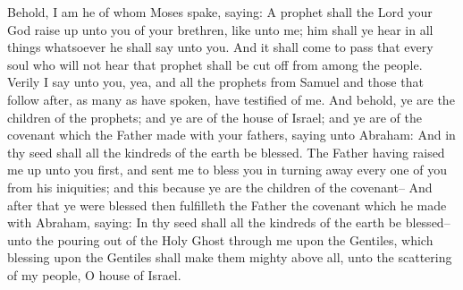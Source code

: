 \bverse \iffalse Behold, I am he of whom Moses spake, saying: A prophet shall the Lord your God raise up unto you of your brethren, like unto me; him shall ye hear in all things whatsoever he shall say unto you. And it shall come to pass that every soul who will not hear that prophet shall be cut off from among the people. \fi
Behold, I am he of whom Moses spake, saying: A prophet shall the Lord your God raise up unto you of your brethren, like unto me; him shall ye hear in all things whatsoever he shall say unto you. And it shall come to pass that every soul who will not hear that prophet shall be cut off from among the people.
\bverse \iffalse Verily I say unto you, yea, and all the prophets from Samuel and those that follow after, as many as have spoken, have testified of me. \fi
Verily I say unto you, yea, and all the prophets from Samuel and those that follow after, as many as have spoken, have testified of me.
\bverse \iffalse And behold, ye are the children of the prophets; and ye are of the house of Israel; and ye are of the covenant which the Father made with your fathers, saying unto Abraham: And in thy seed shall all the kindreds of the earth be blessed. \fi
And behold, ye are the children of the prophets; and ye are of the house of Israel; and ye are of the covenant which the Father made with your fathers, saying unto Abraham: And in thy seed shall all the kindreds of the earth be blessed.
\bverse \iffalse The Father having raised me up unto you first, and sent me to bless you in turning away every one of you from his iniquities; and this because ye are the children of the covenant-- \fi
The Father having raised me up unto you first, and sent me to bless you in turning away every one of you from his iniquities; and this because ye are the children of the covenant--
\bverse \iffalse And after that ye were blessed then fulfilleth the Father the covenant which he made with Abraham, saying: In thy seed shall all the kindreds of the earth be blessed--unto the pouring out of the Holy Ghost through me upon the Gentiles, which blessing upon the Gentiles shall make them mighty above all, unto the scattering of my people, O house of Israel. \fi
And after that ye were blessed then fulfilleth the Father the covenant which he made with Abraham, saying: In thy seed shall all the kindreds of the earth be blessed--unto the pouring out of the Holy Ghost through me upon the Gentiles, which blessing upon the Gentiles shall make them mighty above all, unto the scattering of my people, O house of Israel.
